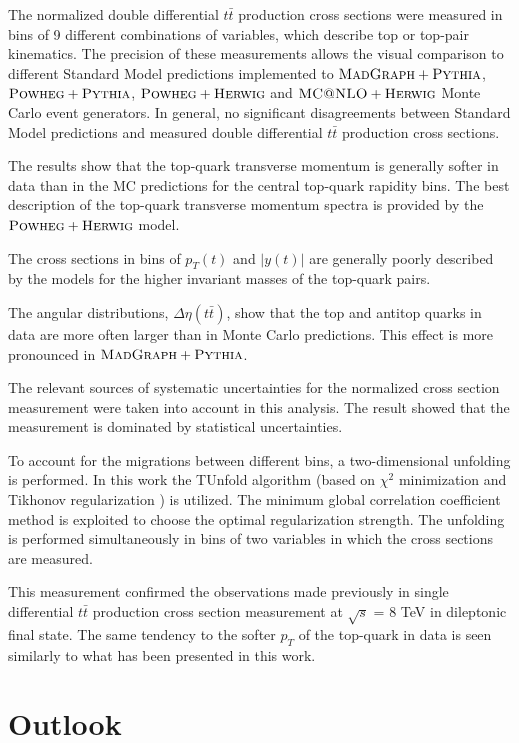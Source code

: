 The normalized double differential $t\bar{t}$ production cross sections were measured in bins of 9 different combinations of
variables, which describe top or top-pair kinematics. The precision of these measurements allows the visual comparison to different 
Standard Model predictions implemented to $\textsc{MadGraph}+\textsc{Pythia}$, $\textsc{Powheg}+\textsc{Pythia}$, $\textsc{Powheg}+\textsc{Herwig}$ and $\textsc{MC@NLO}+\textsc{Herwig}$ Monte Carlo
event generators. In general, no significant disagreements between Standard Model predictions and measured double differential
$t\bar{t}$ production cross sections.

The results show that the top-quark transverse momentum is generally softer in data than in the MC predictions for the central
top-quark rapidity bins. The best description of the top-quark transverse momentum spectra is provided by the $\textsc{Powheg}+\textsc{Herwig}$
model.

The cross sections in bins of $p_{T}(t)$ and $|y(t)|$ are generally poorly described by the models for the higher invariant masses
of the top-quark pairs.

The angular distributions, $\Delta\eta(t\bar{t})$, show that the top and antitop quarks in data are more often larger
than in Monte Carlo predictions. This effect is more pronounced in $\textsc{MadGraph}+\textsc{Pythia}$. 

The relevant sources of systematic uncertainties for the normalized cross section measurement were taken into account in this analysis.
The result showed that the measurement is dominated by statistical uncertainties.

To account for the migrations between different bins, a two-dimensional unfolding is performed. In this work the TUnfold 
algorithm\cite{Schmitt:2012kp} (based on $\chi^{2}$ minimization and Tikhonov regularization \cite{Tikhonov:1963}) is utilized. 
The minimum global correlation coefficient method\cite{VBlobelT} is exploited to choose the 
optimal regularization strength. The unfolding is performed simultaneously in bins of two variables in which the cross
sections are measured.

This measurement confirmed the observations made previously in single differential $t\bar{t}$ production cross section measurement
at $\sqrt{s}$ = 8 TeV\cite{Asin2014Auth} in dileptonic final state. The same tendency to the softer $p_{T}$ of the top-quark in 
data is seen similarly to what has been presented in this work.

\section{Outlook}

